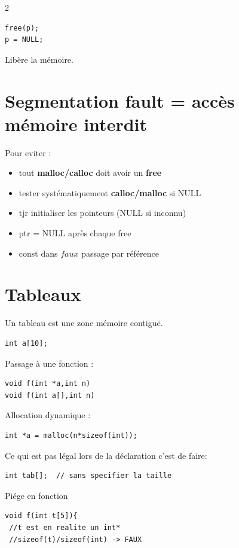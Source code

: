 \documentclass[8pt]{article}
\begin{document}
\begin{multicols}{2}
\begin{lstlisting}
free(p);
p = NULL;
\end{lstlisting}

Libère la mémoire.


\section{Segmentation fault = accès mémoire interdit}
Pour eviter :

\begin{itemize}
  \item tout \textbf{malloc/calloc} doit avoir un \textbf{free}
  \item tester systématiquement \textbf{calloc/malloc} si NULL
  \item tjr initialiser les pointeurs (NULL si inconnu)
  \item ptr = NULL après chaque free
\item const dans $faux$ passage par référence
\end{itemize}
\section{Tableaux}

Un tableau est une zone mémoire contiguë.

\begin{lstlisting}
int a[10];
\end{lstlisting}

Passage à une fonction :

\begin{lstlisting}
void f(int *a,int n)
void f(int a[],int n)
\end{lstlisting}

Allocation dynamique :

\begin{lstlisting}
int *a = malloc(n*sizeof(int));
\end{lstlisting}

Ce qui est pas légal lors de la déclaration c'est de faire:

\begin{lstlisting}
int tab[];  // sans specifier la taille
\end{lstlisting}

Piége en fonction
\begin{lstlisting}
void f(int t[5]){
 //t est en realite un int*
 //sizeof(t)/sizeof(int) -> FAUX


\end{lstlisting}
\end{multicols}
\end{document}

